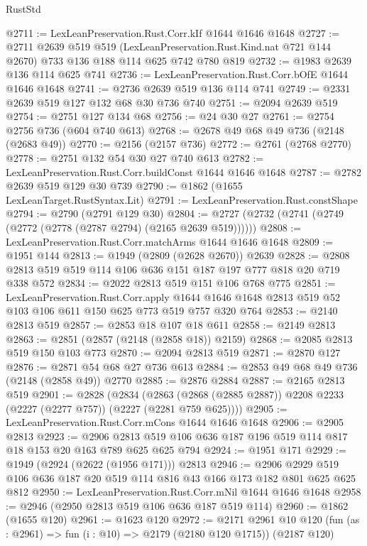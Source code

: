 \begin{lexlean}{RustStd}
\begin{coremodule}
@2711 := LexLeanPreservation.Rust.Corr.kIf @1644 @1646 @1648
@2727 := @2711
    @2639
    @519
    @519
    (LexLeanPreservation.Rust.Kind.nat @721 @144 @2670)
    @733
    @136
    @188
    @114
    @625
    @742
    @780
    @819
@2732 := @1983 @2639 @136 @114 @625 @741
@2736 := LexLeanPreservation.Rust.Corr.bOfE @1644 @1646 @1648
@2741 := @2736 @2639 @519 @136 @114 @741
@2749 := @2331 @2639 @519 @127 @132 @68 @30 @736 @740
@2751 := @2094 @2639 @519
@2754 := @2751 @127 @134 @68
@2756 := @24 @30 @27
@2761 := @2754 @2756 @736 (@604 @740 @613)
@2768 := @2678 @49 @68 @49 @736 (@2148 (@2683 @49))
@2770 := @2156 (@2157 @736)
@2772 := @2761 (@2768 @2770)
@2778 := @2751 @132 @54 @30 @27 @740 @613
@2782 := LexLeanPreservation.Rust.Corr.buildConst @1644 @1646 @1648
@2787 := @2782 @2639 @519 @129 @30 @739
@2790 := @1862 (@1655 LexLeanTarget.RustSyntax.Lit)
@2791 := LexLeanPreservation.Rust.constShape
@2794 := @2790 (@2791 @129 @30)
@2804 := @2727 (@2732 (@2741 (@2749 (@2772 (@2778 (@2787 @2794) (@2165 @2639 @519))))))
@2808 := LexLeanPreservation.Rust.Corr.matchArms @1644 @1646 @1648
@2809 := @1951 @144
@2813 := @1949 (@2809 (@2628 @2670)) @2639
@2828 := @2808 @2813 @519 @519 @114 @106 @636 @151 @187 @197 @777 @818 @20 @719 @338 @572
@2834 := @2022 @2813 @519 @151 @106 @768 @775
@2851 := LexLeanPreservation.Rust.Corr.apply
    @1644
    @1646
    @1648
    @2813
    @519
    @52
    @103
    @106
    @611
    @150
    @625
    @773
    @519
    @757
    @320
    @764
@2853 := @2140 @2813 @519
@2857 := @2853 @18 @107 @18 @611
@2858 := @2149 @2813
@2863 := @2851 (@2857 (@2148 (@2858 @18)) @2159)
@2868 := @2085 @2813 @519 @150 @103 @773
@2870 := @2094 @2813 @519
@2871 := @2870 @127
@2876 := @2871 @54 @68 @27 @736 @613
@2884 := @2853 @49 @68 @49 @736 (@2148 (@2858 @49)) @2770
@2885 := @2876 @2884
@2887 := @2165 @2813 @519
@2901 := @2828
    (@2834 (@2863 (@2868 (@2885 @2887)) @2208 @2233 (@2227 (@2277 @757)) (@2227 (@2281 @759 @625))))
@2905 := LexLeanPreservation.Rust.Corr.mCons @1644 @1646 @1648
@2906 := @2905 @2813
@2923 := @2906 @2813 @519 @106 @636 @187 @196 @519 @114 @817 @18 @153 @20 @163 @789 @625 @625 @794
@2924 := @1951 @171
@2929 := @1949 (@2924 (@2622 (@1956 @171))) @2813
@2946 := @2906 @2929 @519 @106 @636 @187 @20 @519 @114 @816 @43 @166 @173 @182 @801 @625 @625 @812
@2950 := LexLeanPreservation.Rust.Corr.mNil @1644 @1646 @1648
@2958 := @2946 (@2950 @2813 @519 @106 @636 @187 @519 @114)
@2960 := @1862 (@1655 @120)
@2961 := @1623 @120
@2972 := @2171
    @2961
    @10
    @120
    (fun (as : @2961) => fun (i : @10) => @2179 (@2180 @120 @1715))
    (@2187 @120)

\end{coremodule}
\end{lexlean}
